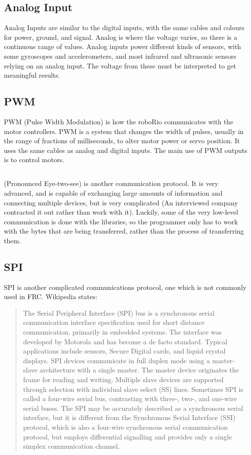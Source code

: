 \documentclass[]{report}
\begin{document}
\subsection{Analog Input}
	Analog Inputs are similar to the digital inputs, with the same cables and colours for power, ground, and signal.
	Analog is where the voltage varies, so there is a continuous range of values.
	Analog inputs power different kinds of sensors, with some gyroscopes and accelerometers, and most infrared and ultrasonic sensors relying on an analog input. The voltage from these must be interpreted to get meaningful results.

\subsection{PWM}
	PWM (Pulse Width Modulation) is how the roboRio communicates with the motor controllers.
	PWM is a system that changes the width of pulses, usually in the range of fractions of milliseconds, to alter motor power or servo position.
	It uses the same cables as analog and digital inputs.
	The main use of PWM outputs is to control motors.

\subsection{\ITwoC}
	\ITwoC (Pronounced Eye-two-see) is another communication protocol.
	It is very advanced, and is capable of exchanging large amounts of information and connecting multiple devices, but is very complicated (An interviewed company contracted it out rather than work with it).
	Luckily, some of the very low-level communication is done with the libraries, so the programmer only has to work with the bytes that are being transferred, rather than the process of transferring them.
\subsection{SPI}
	SPI is another complicated communications protocol, one which is not commonly used in FRC.
	Wikipedia states:
	\begin{quotation}
	The Serial Peripheral Interface (SPI) bus is a synchronous serial communication interface specification used for short distance communication, primarily in embedded systems.
	The interface was developed by Motorola and has become a de facto standard.
	Typical applications include sensors, Secure Digital cards, and liquid crystal displays.
	SPI devices communicate in full duplex mode using a master-slave architecture with a single master.
	The master device originates the frame for reading and writing. Multiple slave devices are supported through selection with individual slave select (SS) lines.
	Sometimes SPI is called a four-wire serial bus, contrasting with three-, two-, and one-wire serial buses.
	The SPI may be accurately described as a synchronous serial interface, but it is different from the Synchronous Serial Interface (SSI) protocol, which is also a four-wire synchronous serial communication protocol, but employs differential signalling and provides only a single simplex communication channel.
\end{quotation}
\end{document}
